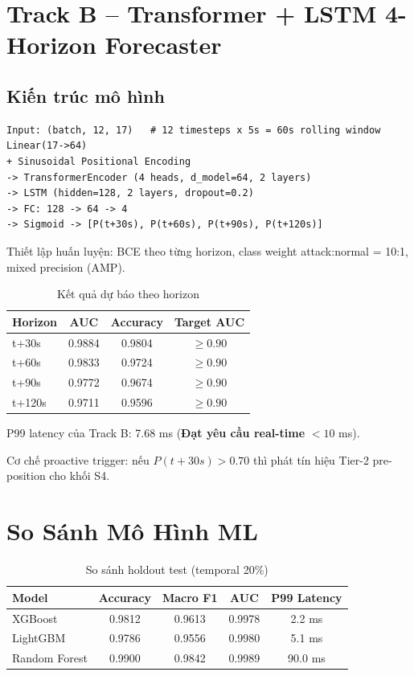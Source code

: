 \documentclass[12pt,a4paper]{article}
\begin{document}
\section{Track B -- Transformer + LSTM 4-Horizon Forecaster}

\subsection{Kiến trúc mô hình}
\begin{verbatim}
Input: (batch, 12, 17)   # 12 timesteps x 5s = 60s rolling window
Linear(17->64)
+ Sinusoidal Positional Encoding
-> TransformerEncoder (4 heads, d_model=64, 2 layers)
-> LSTM (hidden=128, 2 layers, dropout=0.2)
-> FC: 128 -> 64 -> 4
-> Sigmoid -> [P(t+30s), P(t+60s), P(t+90s), P(t+120s)]
\end{verbatim}

Thiết lập huấn luyện: BCE theo từng horizon, class weight attack:normal = 10:1, mixed precision (AMP).

\begin{table}[H]
\centering
\caption{Kết quả dự báo theo horizon}
\begin{tabular}{lccc}
\toprule
\textbf{Horizon} & \textbf{AUC} & \textbf{Accuracy} & \textbf{Target AUC} \\
\midrule
t+30s & 0.9884 & 0.9804 & $\geq 0.90$ \\
t+60s & 0.9833 & 0.9724 & $\geq 0.90$ \\
t+90s & 0.9772 & 0.9674 & $\geq 0.90$ \\
t+120s & 0.9711 & 0.9596 & $\geq 0.90$ \\
\bottomrule
\end{tabular}
\end{table}

P99 latency của Track B: 7.68 ms (\textbf{Đạt yêu cầu real-time} $< 10$ ms).

Cơ chế proactive trigger: nếu $P(t+30s) > 0.70$ thì phát tín hiệu Tier-2 pre-position cho khối S4.

\section{So Sánh Mô Hình ML}

\begin{table}[H]
\centering
\caption{So sánh holdout test (temporal 20\%)}
\begin{tabular}{lcccc}
\toprule
\textbf{Model} & \textbf{Accuracy} & \textbf{Macro F1} & \textbf{AUC} & \textbf{P99 Latency} \\
\midrule
XGBoost & 0.9812 & 0.9613 & 0.9978 & 2.2 ms \\
LightGBM & 0.9786 & 0.9556 & 0.9980 & 5.1 ms \\
Random Forest & 0.9900 & 0.9842 & 0.9989 & 90.0 ms \\
\bottomrule
\end{tabular}
\end{table}
\end{document}
